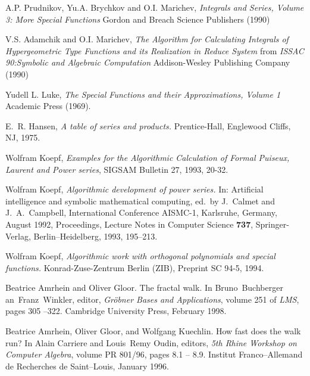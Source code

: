 \begin{thebibliography}{999}
 A.P. Prudnikov, Yu.A. Brychkov and O.I. Marichev,
\emph{Integrals and Series, Volume 3: More Special Functions} Gordon 
and Breach Science Publishers (1990)

 V.S. Adamchik and O.I. Marichev, \emph{The 
Algorithm for Calculating Integrals of Hypergeometric Type Functions 
and its Realization in Reduce System} from \emph{ISSAC 90:Symbolic and 
Algebraic Computation} Addison-Wesley Publishing Company (1990) 

 Yudell L. Luke, \emph{The Special Functions and their
Approximations, Volume 1} Academic Press (1969).


E.\ R. Hansen, {\em A table of series and products.}
Prentice-Hall, Englewood Cliffs, NJ, 1975.


 Wolfram Koepf,
{\em Examples for the Algorithmic Calculation of Formal
Puiseux, Laurent and Power series},
SIGSAM Bulletin 27, 1993, 20-32.

 Wolfram Koepf,
{\em Algorithmic development of power series.} In:
Artificial intelligence and symbolic mathematical computing,
ed.\ by J.\ Calmet and J.\ A.\ Campbell,
International Conference AISMC-1, Karlsruhe, Germany, August 1992, Proceedings,
Lecture Notes in Computer Science \textbf{737}, Springer-Verlag,
Berlin--Heidelberg, 1993, 195--213.

 Wolfram Koepf,
{\em Algorithmic work with orthogonal polynomials and special functions.}
Konrad-Zuse-Zentrum Berlin (ZIB), Preprint SC 94-5, 1994.


Beatrice Amrhein and Oliver Gloor.
\newblock The fractal walk.
\newblock In Bruno~Buchberger an~Franz~Winkler, editor, {\em Gr\"obner Bases
  and Applications}, volume 251 of {\em LMS}, pages 305 --322. Cambridge
  University Press, February 1998.

Beatrice Amrhein, Oliver Gloor, and Wolfgang Kuechlin.
\newblock How fast does the walk run?
\newblock In Alain Carriere and Louis~Remy Oudin, editors, {\em 5th Rhine
  Workshop on Computer Algebra}, volume PR 801/96, pages 8.1 -- 8.9. Institut
  Franco--Allemand de Recherches de Saint--Louis, January 1996.


\end{thebibliography}
